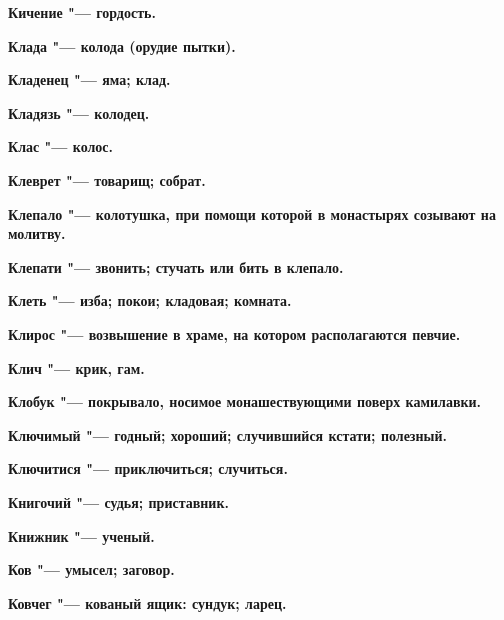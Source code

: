 \begin{multicols}{2}
\bfseries Кичение\normalfont{} "--- гордость. 




\bfseries Клада\normalfont{} "--- колода (орудие пытки). 




\bfseries Кладенец\normalfont{} "--- яма; клад. 




\bfseries Кладязь\normalfont{} "--- колодец. 




\bfseries Клас\normalfont{} "--- колос. 




\bfseries Клеврет\normalfont{} "--- товарищ; собрат. 




\bfseries Клепало\normalfont{} "--- колотушка, при помощи которой в монастырях созывают на молитву. 




\bfseries Клепати\normalfont{} "--- звонить; стучать или бить в клепало. 




\bfseries Клеть\normalfont{} "--- изба; покои; кладовая; комната. 




\bfseries Клирос\normalfont{} "--- возвышение в храме, на котором располагаются певчие. 




\bfseries Клич\normalfont{} "--- крик, гам. 




\bfseries Клобук\normalfont{} "--- покрывало, носимое монашествующими поверх камилавки. 




\bfseries Ключимый\normalfont{} "--- годный; хороший; случившийся кстати; полезный. 




\bfseries Ключитися\normalfont{} "--- приключиться; случиться. 




\bfseries Книгочий\normalfont{} "--- судья; приставник. 




\bfseries Книжник\normalfont{} "--- ученый. 




\bfseries Ков\normalfont{} "--- умысел; заговор. 




\bfseries Ковчег\normalfont{} "--- кованый ящик: сундук; ларец. 





\end{multicols}
